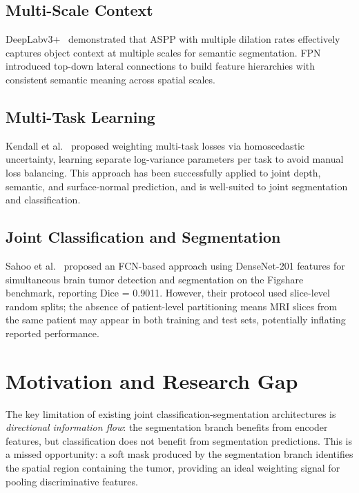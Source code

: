 \documentclass[journal]{IEEEtran}
\begin{document}
\subsection{Multi-Scale Context}
DeepLabv3+~\cite{chen2018deeplabv3plus} demonstrated that ASPP with multiple
dilation rates effectively captures object context at multiple scales for
semantic segmentation. FPN~\cite{lin2017fpn} introduced top-down lateral
connections to build feature hierarchies with consistent semantic meaning
across spatial scales.

\subsection{Multi-Task Learning}
Kendall et al.~\cite{kendall2018multitask} proposed weighting multi-task
losses via homoscedastic uncertainty, learning separate log-variance parameters
per task to avoid manual loss balancing. This approach has been successfully
applied to joint depth, semantic, and surface-normal prediction, and is well-suited
to joint segmentation and classification.

\subsection{Joint Classification and Segmentation}
Sahoo et al.~\cite{sahoo2023brain} proposed an FCN-based approach using DenseNet-201
features for simultaneous brain tumor detection and segmentation on the
Figshare benchmark, reporting Dice = 0.9011. However, their protocol used
slice-level random splits; the absence of patient-level partitioning means
MRI slices from the same patient may appear in both training and test sets,
potentially inflating reported performance.

\section{Motivation and Research Gap}
\label{sec:gap}

The key limitation of existing joint classification-segmentation architectures
is \emph{directional information flow}: the segmentation branch benefits from
encoder features, but classification does not benefit from segmentation
predictions. This is a missed opportunity: a soft mask produced by the
segmentation branch identifies the spatial region containing the tumor,
providing an ideal weighting signal for pooling discriminative features.
\end{document}
